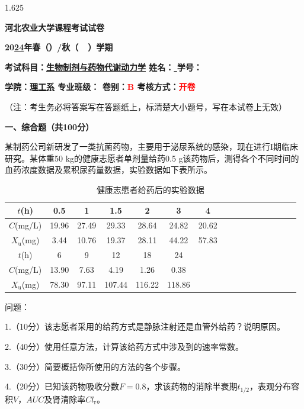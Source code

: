 \documentclass[12pt, b5paper]{article}
\newcommand*{\cred}{\textcolor{red}}
\begin{document}
\begin{spacing}{1.625}

\centerline{{\LARGE \bf{河北农业大学课程考试试卷}}}

\centerline{\bf{\large 20\underline{24}年春（\quad ）/秋（\ \surd \ ）学期}}

{\bf{考试科目：\underline{生物制剂与药物代谢动力学} \hfill 姓名：\underline{ \qquad \qquad} \hfill 学号：\underline{ \qquad \qquad \qquad}}}

{\bf{学院：\underline{\quad 理工系\quad } \hfill 专业班级：\underline{\qquad \qquad \qquad \qquad} \hfill 卷别：\cred{B} \hfill 考核方式：\cred{开卷}}}

（注：考生务必将答案写在答题纸上，标清楚大小题号，写在本试卷上无效）

\bigskip


{\bf{一、综合题（共100分）}}

\qquad 某制药公司新研发了一类抗菌药物，主要用于泌尿系统的感染，现在进行I期临床研究。某体重50 kg的健康志愿者单剂量给药0.5 g该药物后，测得各个不同时间的血药浓度数据及累积尿药量数据，实验数据如下表所示。

\begin{table}[htpb]
    \centering
    \caption{健康志愿者给药后的实验数据}
    \smallskip
    \begin{tabular}{c|ccccccccccccccc}
        \bottomrule
        $t$(h) & 0.5 & 1 & 1.5 & 2 & 3 & 4 \\ \hline
        $C$(mg/L) & 19.96 & 27.49 & 29.33 & 28.64 & 24.82 & 20.62 \\ \hline
        $X_\mathrm{u}$(mg) & 3.44 & 10.76 & 19.37 & 28.11 & 44.22 & 57.83  \\ \toprule \bottomrule
        $t$(h) & 6 & 9 & 12 & 18 & 24 \\ \hline
        $C$(mg/L)  & 13.90 & 7.63 & 4.19 & 1.26 & 0.38\\ \hline
        $X_\mathrm{u}$(mg) & 78.30 & 97.11 & 107.44 & 116.22 & 118.86 \\ \toprule 
    \end{tabular}
\end{table}


问题：

1.（10分）该志愿者采用的给药方式是静脉注射还是血管外给药？说明原因。

2.（40分）使用任意方法，计算该给药方式中涉及到的速率常数。

3.（30分）简要概括你所使用的方法的各个步骤。

4.（20分）已知该药物吸收分数$F=0.8$，求该药物的消除半衰期$t_{1/2}$，表观分布容积$V$，$AUC$及肾清除率$Cl_\mathrm{r}$。


\end{spacing}
\end{document}

